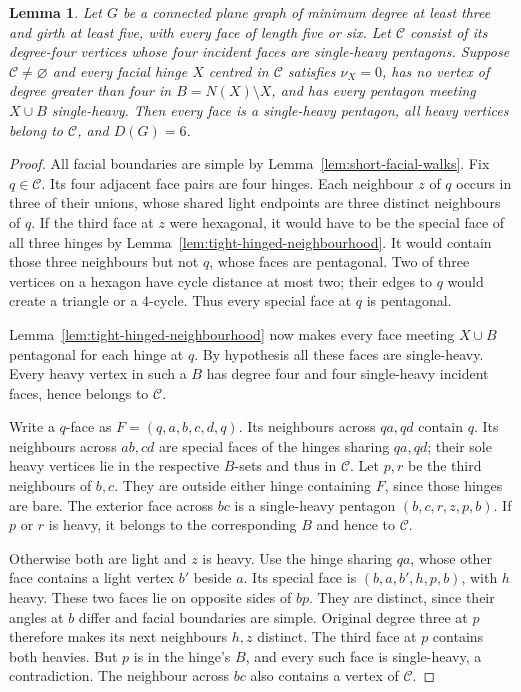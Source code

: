 \documentclass[11pt]{article}
\newtheorem{lemma}[theorem]{Lemma}
\theoremstyle{remark}
\numberwithin{equation}{section}
\numberwithin{table}{section}
\begin{document}
\begin{lemma}\label{lem:saturated-clean-centres}
Let $G$ be a connected plane graph of minimum degree at least three
and girth at least five, with every face of length five or six. Let
$\mathcal C$ consist of its degree-four vertices whose four incident
faces are single-heavy pentagons. Suppose $\mathcal C\ne\varnothing$
and every facial hinge $X$ centred in $\mathcal C$ satisfies
$\nu_X=0$, has no vertex of degree greater than four in
$B=N(X)\setminus X$, and has every pentagon meeting $X\cup B$
single-heavy. Then every face is a single-heavy pentagon, all heavy
vertices belong to $\mathcal C$, and $D(G)=6$.
\end{lemma}
\begin{proof}
All facial boundaries are simple by Lemma~\ref{lem:short-facial-walks}.
Fix $q\in\mathcal C$. Its four adjacent face pairs are four hinges.
Each neighbour $z$ of $q$ occurs in three of their unions, whose
shared light endpoints are three distinct neighbours of $q$.
If the third face at $z$ were hexagonal, it would have to be the
special face of all three hinges by
Lemma~\ref{lem:tight-hinged-neighbourhood}. It would contain those
three neighbours but not $q$, whose faces are pentagonal. Two of
three vertices on a hexagon have cycle distance at most two; their
edges to $q$ would create a triangle or a $4$-cycle. Thus every
special face at $q$ is pentagonal.

Lemma~\ref{lem:tight-hinged-neighbourhood} now makes every face
meeting $X\cup B$ pentagonal for each hinge at $q$. By hypothesis
all these faces are single-heavy. Every heavy vertex in such a $B$
has degree four and four single-heavy incident faces, hence belongs
to $\mathcal C$.

Write a $q$-face as $F=(q,a,b,c,d,q)$. Its neighbours across $qa,qd$
contain $q$. Its neighbours across $ab,cd$ are special faces of the
hinges sharing $qa,qd$; their sole heavy vertices lie in the
respective $B$-sets and thus in $\mathcal C$.
Let $p,r$ be the third neighbours of $b,c$. They are outside either
hinge containing $F$, since those hinges are bare. The exterior face
across $bc$ is a single-heavy pentagon $(b,c,r,z,p,b)$. If $p$ or
$r$ is heavy, it belongs to the corresponding $B$ and hence to
$\mathcal C$.

Otherwise both are light and $z$ is heavy. Use the hinge sharing
$qa$, whose other face contains a light vertex $b'$ beside $a$.
Its special face is $(b,a,b',h,p,b)$, with $h$ heavy. These two
faces lie on opposite sides of $bp$. They are distinct, since their
angles at $b$ differ and facial boundaries are simple. Original
degree three at $p$ therefore makes its next neighbours $h,z$
distinct. The third face at $p$ contains both heavies. But $p$ is
in the hinge's $B$, and every such face is single-heavy, a
contradiction. The neighbour across $bc$ also contains a vertex of
$\mathcal C$.


\end{proof}
\end{document}
